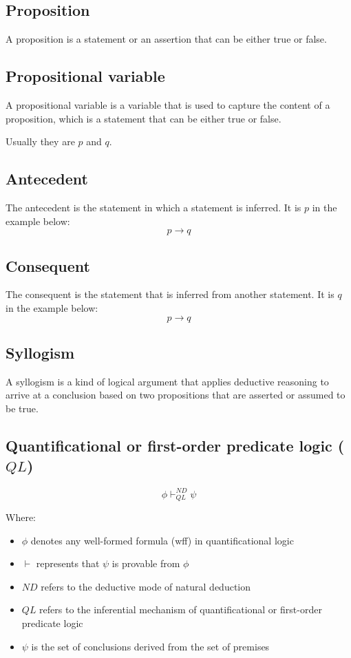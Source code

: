 \documentclass[11pt]{article}
\begin{document}
\subsection{Proposition}
\label{sec:orgef68b9b}
A proposition is a statement or an assertion that can be either true or false.
\subsection{Propositional variable}
\label{sec:org4b1b90f}
A propositional variable is a variable that is used to capture the content of a proposition, which is a statement that can be either true or false.

Usually they are \(p\) and \(q\).
\subsection{Antecedent}
\label{sec:orgbb03722}
The antecedent is the statement in which a statement is inferred. It is \(p\) in the example below:
\[p \rightarrow q\]
\subsection{Consequent}
\label{sec:orgfc50f10}
The consequent is the statement that is inferred from another statement. It is \(q\) in the example below:
\[p \rightarrow q\]
\subsection{Syllogism}
\label{sec:org22d338a}
A syllogism is a kind of logical argument that applies deductive reasoning to arrive at a conclusion based on two propositions that are asserted or assumed to be true.
\subsection{Quantificational or first-order predicate logic (\(QL\))}
\label{sec:orga0897f2}
\[\phi \vdash^{ND}_{QL} \psi\]

Where:
\begin{itemize}
\item \(\phi\) denotes any well-formed formula (wff) in quantificational logic
\item \(\vdash\) represents that \(\psi\) is provable from \(\phi\)
\item \(ND\) refers to the deductive mode of natural deduction
\item \(QL\) refers to the inferential mechanism of quantificational or first-order predicate logic
\item \(\psi\) is the set of conclusions derived from the set of premises
\end{itemize}
\end{document}
